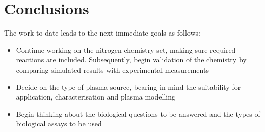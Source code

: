 \documentclass[11pt, oneside]{article}   	%
\begin{document}
%

\section{Conclusions}

The work to date leads to the next immediate goals as follows:
\begin{itemize}
\item Continue working on the nitrogen chemistry set, making sure required reactions are included. Subsequently, begin validation of the chemistry by comparing simulated results with experimental measurements
\item Decide on the type of plasma source, bearing in mind the suitability for application, characterisation and plasma modelling
\item Begin thinking about the biological questions to be answered and the types of biological assays to be used
\end{itemize}

\scriptsize


\end{document}
